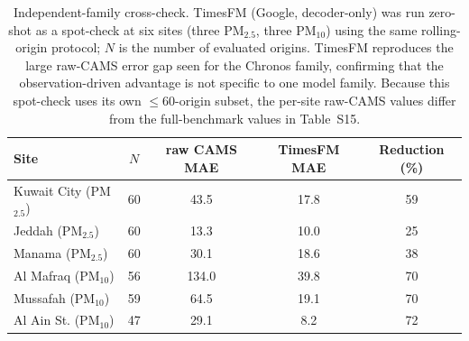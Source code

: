 \documentclass[11pt]{article}
\begin{document}
\begin{table}[htbp]\centering\footnotesize
\caption{Independent-family cross-check. TimesFM (Google, decoder-only) was run zero-shot as a spot-check at six sites (three PM$_{2.5}$, three PM$_{10}$) using the same rolling-origin protocol; $N$ is the number of evaluated origins. TimesFM reproduces the large raw-CAMS error gap seen for the Chronos family, confirming that the observation-driven advantage is not specific to one model family. Because this spot-check uses its own $\leq$60-origin subset, the per-site raw-CAMS values differ from the full-benchmark values in Table~S15.}
\begin{tabular}{lcccc}\toprule
Site & $N$ & raw CAMS MAE & TimesFM MAE & Reduction (\%) \\ \midrule
Kuwait City (PM$_{2.5}$) & 60 & 43.5 & 17.8 & 59 \\
Jeddah (PM$_{2.5}$) & 60 & 13.3 & 10.0 & 25 \\
Manama (PM$_{2.5}$) & 60 & 30.1 & 18.6 & 38 \\
Al Mafraq (PM$_{10}$) & 56 & 134.0 & 39.8 & 70 \\
Mussafah (PM$_{10}$) & 59 & 64.5 & 19.1 & 70 \\
Al Ain St. (PM$_{10}$) & 47 & 29.1 & 8.2 & 72 \\
\bottomrule\end{tabular}\end{table}
\end{document}
